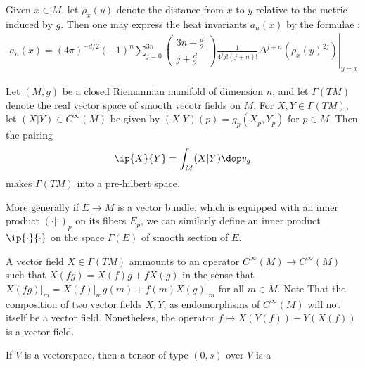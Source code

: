 Given $x\in M$, let $\rho_x(y)$ denote the distance from $x$ to $y$ relative to the metric induced by $g$.  Then one may express the heat invariants $a_n(x)$ by the formulae \cite[Theorem 1.2.1]{polterovichHeatInvariantsRiemannian2000}:
\begin{align}
    a_n(x) = \left.(4 \pi)^{-d / 2}(-1)^n \sum_{j=0}^{3 n}\left(\begin{array}{c}
                                                                        3 n+\frac{d}{2} \\
                                                                        j+\frac{d}{2}
                                                                    \end{array}\right) \frac{1}{4^j j !(j+n) !} \Delta^{j+n}\left(\rho_x(y)^{2 j}\right)\right|_{y=x}
\end{align}


\newpage

Let $(M,g)$ be a closed Riemannian manifold of dimension $n$, and let $\Gamma(TM)$ denote the real vector space of smooth vecotr fields on $M$. For $X,Y \in \Gamma(TM)$, let $(X|Y) \in C^\infty(M)$ be given by $(X|Y)(p) = g_p(X_p,Y_p)$ for $p \in M$. Then the pairing
\begin{align*}
    \ip{X}{Y} = \int_M (X|Y) \dop v_g
\end{align*}
makes $\Gamma(TM)$ into a pre-hilbert space.

More generally if $E \to M$ is a vector bundle, which is equipped with an inner product $(\cdot | \cdot)_p$ on its fibers $E_p$, we can similarly define an inner product $\ip{\cdot}{\cdot}$ on the space $\Gamma(E)$ of smooth section of $E$.

\newpage
A vector field $X \in \Gamma(TM)$ ammounts to an operator $C^\infty(M) \to C^\infty(M)$ such that $X(fg)= X(f)g+fX(g)$ in the sense that $X(fg)\vert_m = X(f)\vert_m g(m) + f(m) X(g)\vert_m$ for all $m \in M$. Note That the composition of two vector fields $X,Y$, as endomorphisms of $C^\infty(M)$ will not itself be a vector field. Nonetheless, the operator $f \mapsto X(Y(f)) - Y(X(f))$ is a vector field.

If $V$ is a vectorspace, then a tensor of type $(0,s)$ over $V$ is a